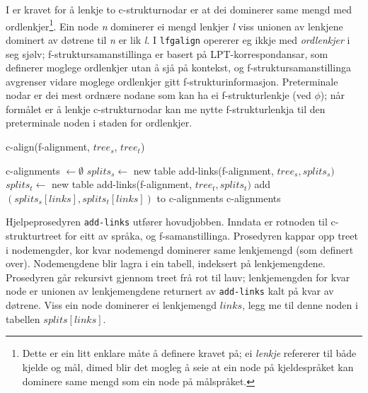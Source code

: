 \documentclass[11pt,a4paper,oneside,draft]{book}
\begin{document}
I \citet[s.~77]{dyvik2009lmp} er kravet for å lenkje to
c-strukturnodar er at dei dominerer same mengd med
ordlenkjer\footnote{Dette er ein litt enklare måte å definere kravet på; ei
        \emph{lenkje} refererer til både kjelde og mål, dimed blir det
        mogleg å seie at ein node på kjeldespråket kan dominere same
        mengd som ein node på målspråket. }. Ein node \emph{n} dominerer ei mengd lenkjer \emph{l} viss
unionen av lenkjene dominert av døtrene til \emph{n} er lik \emph{l}. I
\texttt{lfgalign} opererer eg ikkje med \emph{ordlenkjer} i seg sjølv;
f-struktursamanstillinga er basert på LPT-korrespondansar, som
definerer moglege ordlenkjer utan å sjå på kontekst, og
f-struktursamanstillinga avgrenser vidare moglege ordlenkjer gitt
f-strukturinformasjon. Preterminale nodar er dei mest ordnære nodane
som kan ha ei f-strukturlenkje (ved $\phi$); når formålet er å lenkje
c-strukturnodar kan me nytte f-strukturlenkja til den preterminale
noden i staden for ordlenkjer.  

 \begin{algorithm}[]
   \caption{c-align(f-alignment, $tree_s$, $tree_t$)}
   \label{algo:c-align}
    
   c-alignments $\gets \emptyset$ \;
   $splits_s \gets$ new table \;
   add-links(f-alignment, $tree_s, splits_s)$  \;
   $splits_t \gets$ new table \;
   add-links(f-alignment, $tree_t, splits_t)$  \;
    {
        {
             add $(splits_s[links],splits_t[links])$ to c-alignments \;
        }
    }
    \Return c-alignments \;
    \end{algorithm}    

Hjelpeprosedyren \texttt{add-links} utfører hovudjobben. Inndata er rotnoden
til c-strukturtreet for eitt av språka, og
f-samanstillinga. Prosedyren kappar opp treet i nodemengder, kor kvar
nodemengd dominerer same lenkjemengd (som definert over).
Nodemengdene blir lagra i ein tabell, indeksert på
lenkjemengdene. Prosedyren går rekursivt gjennom treet frå rot til
lauv; lenkjemengden for kvar node er unionen av lenkjemengdene
returnert av \texttt{add-links} kalt på kvar av døtrene. Viss ein node
dominerer ei lenkjemengd $links$, legg me til denne noden i tabellen
$splits[links]$. 
\end{document}
